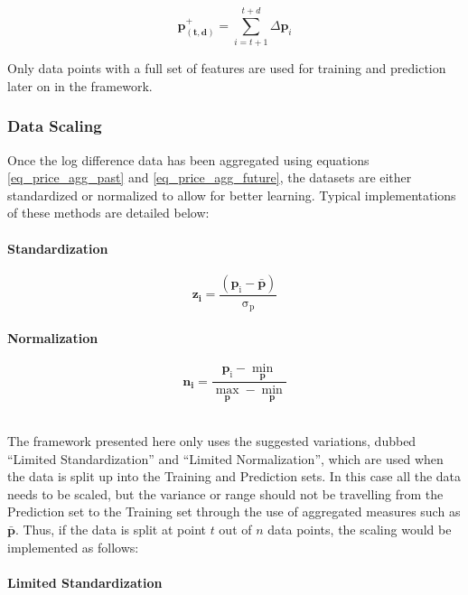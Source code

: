 \documentclass[a4paper,11pt,oneside]{article}
\theoremstyle{plain}
\theoremstyle{definition}
\begin{document}
	\begin{equation}\label{eq_price_agg_future}
	 \mathbf{p^{+}_{(t,d)}} = \sum_{i = t+1}^{t+d} \Delta\mathbf{p}_i
	\end{equation}
	
	Only data points with a full set of features are used for training and prediction later on in the framework.
	
	\subsubsection{Data Scaling}\label{data_scaling}
	Once the log difference data has been aggregated using equations \ref{eq_price_agg_past} and \ref{eq_price_agg_future}, the datasets are either standardized or normalized to allow for better learning. Typical implementations of these methods are detailed below:
	
	\paragraph{Standardization}
	\begin{equation}
	\mathbf{z_i}= \mathrm{\frac{(\mathbf{p}_i - \mathbf{\bar{p}}) }{\sigma_p}}
	\end{equation}
	
	\paragraph{Normalization}
	
	\begin{equation}\label{eq_ltd_normalization}
	\mathbf{n_i}= 
	\frac{\mathrm{\mathbf{p}_i - \min\limits_{\mathbf{p}}}}
	{\mathrm{\max\limits_{\mathbf{p}} -\min\limits_{\mathbf{p}}}}
	\end{equation}
	
	~\\
	The framework presented here only uses the suggested variations, dubbed ``Limited Standardization'' and ``Limited Normalization'', which are used when the data is split up into the Training and Prediction sets. In this case all the data needs to be scaled, but the variance or range should not be travelling from the Prediction set to the Training set through the use of aggregated measures such as $\bar{\mathbf{p}}$. Thus, if the data is split at point $t$ out of $n$ data points, the scaling would be implemented as follows:
	
	\paragraph{Limited Standardization}
	
\end{document}
